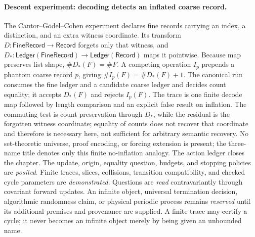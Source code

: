 \paragraph{Descent experiment: decoding detects an inflated coarse record.}
The Cantor--Gödel--Cohen experiment declares fine records carrying an index, a distinction, and an extra witness coordinate.
Its transform \(D:\mathsf{FineRecord}\to\mathsf{Record}\) forgets only that witness, and \(D_*:\mathsf{Ledger}(\mathsf{FineRecord})\to\mathsf{Ledger}(\mathsf{Record})\) maps it pointwise.
Because map preserves list shape, \(\#D_*(F)=\#F\).
A competing operation \(I_p\) prepends a phantom coarse record \(p\), giving \(\#I_p(F)=\#D_*(F)+1\).
The canonical run consumes the fine ledger and a candidate coarse ledger and decides count equality; it accepts \(D_*(F)\) and rejects \(I_p(F)\).
The trace is one finite decode map followed by length comparison and an explicit false result on inflation.
The commuting test is count preservation through \(D_*\), while the residual is the forgotten witness coordinate; equality of counts does not recover that coordinate and therefore is necessary here, not sufficient for arbitrary semantic recovery.
No set-theoretic universe, proof encoding, or forcing extension is present; the three-name title denotes only this
finite no-inflation analogy.
The action ledger closes the chapter.  The update, origin, equality question, budgets, and stopping policies are
\emph{posited}.  Finite traces, slices, collisions, transition compatibility, and checked cycle parameters are
\emph{demonstrated}.  Questions are \emph{read} contravariantly through covariant forward updates.  An infinite object,
universal termination decision, algorithmic randomness claim, or physical periodic process remains \emph{reserved}
until its additional premises and provenance are supplied.  A finite trace may certify a cycle; it never becomes an
infinite object merely by being given an unbounded name.
